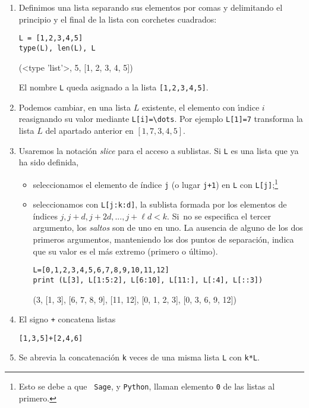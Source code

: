 \begin{enumerate}
 \item Definimos una lista separando sus elementos por comas y delimitando el
principio y
el final de la lista con corchetes cuadrados:
\begin{lstlisting}[numbers=none]
L = [1,2,3,4,5]
type(L), len(L), L
\end{lstlisting}
\begin{Output}
	(<type 'list'>, 5, [1, 2, 3, 4, 5])
\end{Output}

El nombre \lstinline|L| queda asignado a la lista \lstinline|[1,2,3,4,5]|. 
\item Podemos cambiar, en una lista $L$ existente, el elemento con \'{\i}ndice
$i$ reasignando su valor mediante \lstinline|L[i]=\dots|. Por ejemplo
\lstinline|L[1]=7| transforma la lista
$L$ del apartado anterior en $[1,7,3,4,5]$.
\item Usaremos la notación \emph{slice} 
para el acceso a sublistas. Si \lstinline|L| es una lista que ya ha sido
definida, 
\begin{itemize}
 \item seleccionamos el elemento de índice {\tt j} (o lugar {\tt j+1}) en
\lstinline|L|
con \lstinline|L[j]|;\footnote{Esto se debe a que {\tt
Sage}, y {\tt Python},  llaman elemento {\tt 0} de las listas al primero.}

\item seleccionamos con \lstinline|L[j:k:d]|, la sublista formada por los
elementos de
índices $j,j+d,j+2d,..., j+\ell d<k$. Si~no se
especifica el tercer argumento, los \emph{saltos} son de uno en uno. La ausencia
de
alguno de los dos primeros argumentos, manteniendo los dos
puntos de separación, indica que su valor es el más extremo (primero o último).
\begin{lstlisting}
L=[0,1,2,3,4,5,6,7,8,9,10,11,12]
print (L[3], L[1:5:2], L[6:10], L[11:], L[:4], L[::3])
\end{lstlisting}
\begin{Output}
	(3, [1, 3], [6, 7, 8, 9], [11, 12], [0, 1, 2, 3], [0, 3, 6, 9, 12])
\end{Output}
\end{itemize}
\item El signo \lstinline|+| concatena listas
\begin{lstlisting}
[1,3,5]+[2,4,6] 
\end{lstlisting}
\begin{Output}
	[1, 3, 5, 2, 4, 6]
\end{Output}

\item Se abrevia la concatenación  \lstinline|k| veces de una misma lista
\lstinline|L|
con \lstinline|k*L|. 


\end{enumerate}
